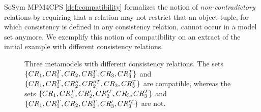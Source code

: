 \begin{copiedFrom}{SoSym MPM4CPS}
\autoref{def:compatibility} formalizes the notion of \emph{non-contradictory} relations by requiring that a relation may not restrict that an object tuple, for which consistency is defined in any consistency relation, cannot occur in a model set anymore.
We exemplify this notion of compatibility on an extract of the initial example with different consistency relations.


\begin{figure}
    \centering
    
    \caption{Three metamodels with different consistency relations. The sets $\{ CR_{1}, CR^T_{1},CR_{2}, CR^T_{2}, CR_{3}, CR^T_{3} \}$ and $\{ CR_{1}, CR^T_{1}, CR''_{2}, CR''^T_{2}, CR_{3}, CR^T_{3} \}$ are compatible, whereas the sets $\{ CR_{1}, CR^T_{1}, CR'_{2}, CR'^T_{2}, CR_{3}, CR^T_{3} \}$ and $\{ CR_{1}, CR^T_{1}, CR_{2}, CR^T_{2}, CR'_{3}, CR'^T_{3} \}$ are not.}
    \label{fig:correctness:formal:incompatibility_example}
\end{figure}


\end{copiedFrom}

